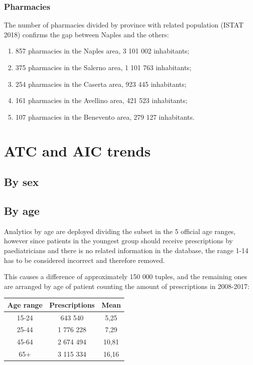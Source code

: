 \subsubsection{Pharmacies}
The number of pharmacies divided by province with related population (ISTAT 2018) confirms the gap between Naples and the others: 
\begin{enumerate}
	\item 857 pharmacies in the Naples area, 3 101 002 inhabitants;
	\item 375 pharmacies in the Salerno area, 1 101 763 inhabitants;
	\item 254 pharmacies in the Caserta area, 923 445 inhabitants;
	\item 161 pharmacies in the Avellino area, 421 523 inhabitants;
	\item 107 pharmacies in the Benevento area, 279 127 inhabitants.
\end{enumerate}

\section{ATC and AIC trends}

\subsection{By sex}

\subsection{By age}
Analytics by age are deployed dividing the subset in the 5 official age ranges, however since patients in the youngest group should receive prescriptions by paediatricians and there is no related information in the database, the range 1-14 has to be considered incorrect and therefore removed.

This causes a difference of approximately 150 000 tuples, and the remaining ones are arranged by age of patient counting the amount of prescriptions in 2008-2017:

\begin{center}
	\begin{tabular}{|c|c|c|}
		\hline
		Age range & Prescriptions & Mean\\
		\hline
		15-24 & 643 540 & 5,25 \\
		\hline
		25-44 & 1 776 228 & 7,29 \\
		\hline
		45-64 & 2 674 494 & 10,81 \\
		\hline
		65+ & 3 115 334 & 16,16 \\
		\hline
	\end{tabular}
\end{center}

